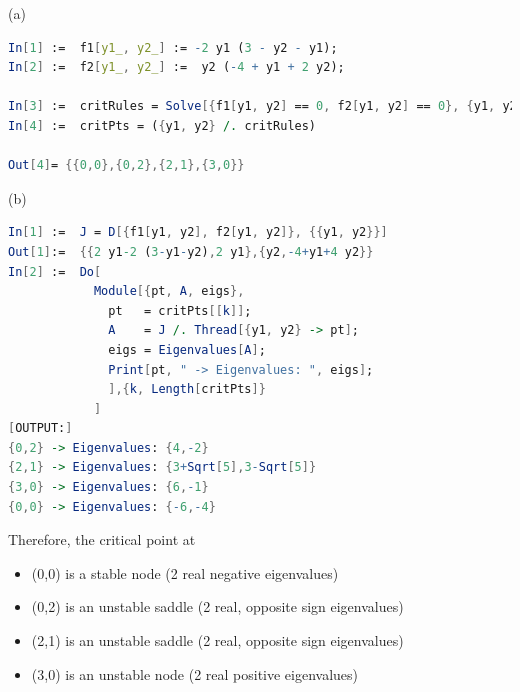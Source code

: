 \documentclass[a4paper,11pt]{report}
\begin{document}
\newpage
{}
\sol (a)
\begin{lstlisting}[language=Mathematica]
In[1] :=  f1[y1_, y2_] := -2 y1 (3 - y2 - y1);
In[2] :=  f2[y1_, y2_] :=  y2 (-4 + y1 + 2 y2);

In[3] :=  critRules = Solve[{f1[y1, y2] == 0, f2[y1, y2] == 0}, {y1, y2}];
In[4] :=  critPts = ({y1, y2} /. critRules)

Out[4]= {{0,0},{0,2},{2,1},{3,0}} 
\end{lstlisting}

\sol (b)
\begin{lstlisting}[language=Mathematica]
In[1] :=  J = D[{f1[y1, y2], f2[y1, y2]}, {{y1, y2}}]
Out[1]:=  {{2 y1-2 (3-y1-y2),2 y1},{y2,-4+y1+4 y2}}
In[2] :=  Do[
            Module[{pt, A, eigs},
              pt   = critPts[[k]];
              A    = J /. Thread[{y1, y2} -> pt];
              eigs = Eigenvalues[A];
              Print[pt, " -> Eigenvalues: ", eigs];
              ],{k, Length[critPts]}
            ]
[OUTPUT:]
{0,2} -> Eigenvalues: {4,-2}
{2,1} -> Eigenvalues: {3+Sqrt[5],3-Sqrt[5]}
{3,0} -> Eigenvalues: {6,-1}
{0,0} -> Eigenvalues: {-6,-4}
\end{lstlisting}
Therefore, the critical point at 
\begin{itemize}[itemsep=0em]
  \item (0,0) is a stable node (2 real negative eigenvalues)
  \item (0,2) is an unstable saddle (2 real, opposite sign eigenvalues)
  \item (2,1) is an unstable saddle (2 real, opposite sign eigenvalues)
  \item (3,0) is an unstable node (2 real positive eigenvalues)
\end{itemize}
\end{document}
